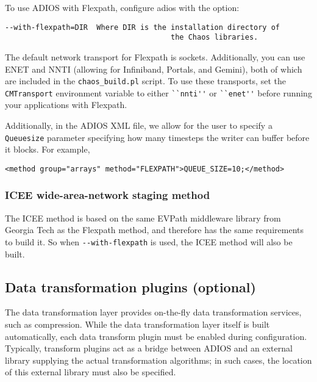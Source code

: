\noindent To use ADIOS with Flexpath, configure adios with the option:

\begin{lstlisting}
--with-flexpath=DIR  Where DIR is the installation directory of
                                      the Chaos libraries.
\end{lstlisting}

The default network transport for Flexpath is sockets. Additionally, you can use ENET and NNTI (allowing for Infiniband, Portals, and Gemini), both of which
are included in the \verb+chaos_build.pl+ script. To use these transports, set the \verb+CMTransport+ environment variable to either \verb+``nnti''+ or \verb+``enet''+ before running your applications with Flexpath.

Additionally, in the ADIOS XML file, we allow for the user to specify a \verb+Queuesize+ parameter specifying how many timesteps the writer can buffer before it blocks. For example,

\begin{lstlisting}
<method group="arrays" method="FLEXPATH">QUEUE_SIZE=10;</method>
\end{lstlisting}


\subsubsection{ICEE wide-area-network staging method}
The ICEE method is based on the same EVPath middleware library from Georgia Tech as the Flexpath method, and therefore has the same requirements to build it. So when \verb+--with-flexpath+ is used, the ICEE method will also be built.




\subsection{Data transformation plugins (optional)}
\label{sec:installation-data-transforms}

The data transformation layer provides on-the-fly data transformation services, such as compression.
While the data transformation layer itself is built automatically, each data transform plugin
must be enabled during configuration. Typically, transform plugins act as a bridge between ADIOS and
an external library supplying the actual transformation algorithms; in such cases, the location
of this external library must also be specified.

